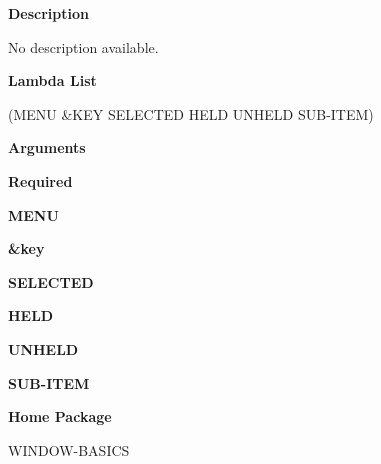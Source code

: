  
{\bf Description}

No description available.

 
{\bf Lambda List}

(MENU \&KEY SELECTED HELD UNHELD SUB-ITEM)

 
{\bf Arguments}


\beginhang
{\bf Required}\hspace{2em}
 
{\bf MENU}


 
\endhang
\beginhang
{\bf \&key}\hspace{2em}
 
{\bf SELECTED}


 
{\bf HELD}


 
{\bf UNHELD}


 
{\bf SUB-ITEM}


 
\endhang
 
{\bf Home Package}

WINDOW-BASICS


